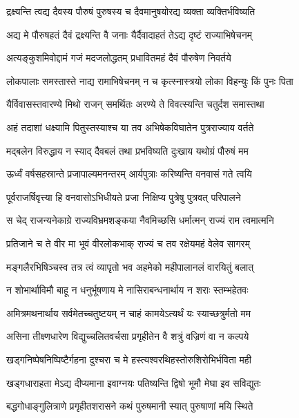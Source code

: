 \twolineshloka
{द्रक्ष्यन्ति त्वद्य दैवस्य पौरुषं पुरुषस्य च}
{दैवमानुषयोरद्य व्यक्ता व्यक्तिर्भविष्यति} %

\twolineshloka
{अद्य मे पौरुषहतं दैवं द्रक्ष्यन्ति वै जनाः}
{यैर्दैवादाहतं तेऽद्य दृष्टं राज्याभिषेचनम्} %

\twolineshloka
{अत्यङ्कुशमिवोद्दामं गजं मदजलोद्धतम्}
{प्रधावितमहं दैवं पौरुषेण निवर्तये} %

\twolineshloka
{लोकपालाः समस्तास्ते नाद्य रामाभिषेचनम्}
{न च कृत्स्नास्त्रयो लोका विहन्युः किं पुनः पिता} %

\twolineshloka
{यैर्विवासस्तवारण्ये मिथो राजन् समर्थितः}
{अरण्ये ते विवत्स्यन्ति चतुर्दश समास्तथा} %

\twolineshloka
{अहं तदाशां धक्ष्यामि पितुस्तस्याश्च या तव}
{अभिषेकविघातेन पुत्रराज्याय वर्तते} %

\twolineshloka
{मद्बलेन विरुद्धाय न स्याद् दैवबलं तथा}
{प्रभविष्यति दुःखाय यथोग्रं पौरुषं मम} %

\twolineshloka
{ऊर्ध्वं वर्षसहस्रान्ते प्रजापाल्यमनन्तरम्}
{आर्यपुत्राः करिष्यन्ति वनवासं गते त्वयि} %

\twolineshloka
{पूर्वराजर्षिवृत्त्या हि वनवासोऽभिधीयते}
{प्रजा निक्षिप्य पुत्रेषु पुत्रवत् परिपालने} %

\twolineshloka
{स चेद् राजन्यनेकाग्रे राज्यविभ्रमशङ्कया}
{नैवमिच्छसि धर्मात्मन् राज्यं राम त्वमात्मनि} %

\twolineshloka
{प्रतिजाने च ते वीर मा भूवं वीरलोकभाक्}
{राज्यं च तव रक्षेयमहं वेलेव सागरम्} %

\twolineshloka
{मङ्गलैरभिषिञ्चस्व तत्र त्वं व्यापृतो भव}
{अहमेको महीपालानलं वारयितुं बलात्} %

\twolineshloka
{न शोभार्थाविमौ बाहू न धनुर्भूषणाय मे}
{नासिराबन्धनार्थाय न शराः स्तम्भहेतवः} %

\twolineshloka
{अमित्रमथनार्थाय सर्वमेतच्चतुष्टयम्}
{न चाहं कामयेऽत्यर्थं यः स्याच्छत्रुर्मतो मम} %

\twolineshloka
{असिना तीक्ष्णधारेण विद्युच्चलितवर्चसा}
{प्रगृहीतेन वै शत्रुं वज्रिणं वा न कल्पये} %

\twolineshloka
{खड्गनिष्पेषनिष्पिष्टैर्गहना दुश्चरा च मे}
{हस्त्यश्वरथिहस्तोरुशिरोभिर्भविता मही} %

\twolineshloka
{खड्गधाराहता मेऽद्य दीप्यमाना इवाग्नयः}
{पतिष्यन्ति द्विषो भूमौ मेघा इव सविद्युतः} %

\twolineshloka
{बद्धगोधाङ्गुलित्राणे प्रगृहीतशरासने}
{कथं पुरुषमानी स्यात् पुरुषाणां मयि स्थिते} %

